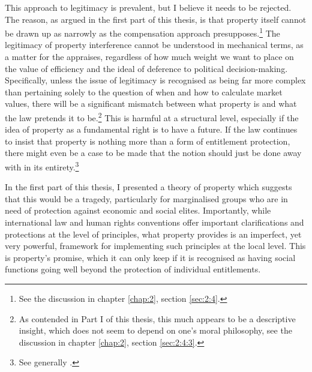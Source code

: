 This approach to legitimacy is prevalent, but I believe it needs to be rejected. The reason, as argued in the first part of this thesis, is that property itself cannot be drawn up as narrowly as the compensation approach presupposes.\footnote{See the discussion in chapter \ref{chap:2}, section \ref{sec:2:4}.} The legitimacy of property interference cannot be understood in mechanical terms, as a matter for the appraises, regardless of how much weight we want to place on the value of efficiency and the ideal of deference to political decision-making. Specifically, unless the issue of legitimacy is recognised as being far more complex than pertaining solely to the question of when and how to calculate market values, there will be a significant mismatch between what property is and what the law pretends it to be.\footnote{As contended in Part I of this thesis, this much appears to be a descriptive insight, which does not seem to depend on one's moral philosophy, see the discussion in chapter \ref{chap:2}, section \ref{sec:2:4:3}.}
This is harmful at a structural level, especially if the idea of property as a fundamental right is to have a future. If the law continues to insist that property is nothing more than a form of entitlement protection, there might even be a case to be made that the notion should just be done away with in its entirety.\footnote{See generally \cite{grey80}.}

In the first part of this thesis, I presented a theory of property which suggests that this would be a tragedy, particularly for marginalised groups who are in need of protection against economic and social elites. Importantly, while international law and human rights conventions offer important clarifications and protections at the level of principles, what property provides is an imperfect, yet very powerful, framework for implementing such principles at the local level. This is property's promise, which it can only keep if it is recognised as having social functions going well beyond the protection of individual entitlements.

